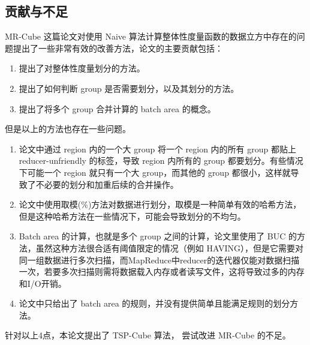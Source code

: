 \subsection{贡献与不足}

MR-Cube \cite{nandi2011distributed} 这篇论文对使用 Naive 算法计算整体性度量函数的数据立方中存在的问题提出了一些非常有效的改善方法，论文的主要贡献包括：

\begin{enumerate}
\item 提出了对整体性度量划分的方法。
\item 提出了如何判断 group 是否需要划分，以及其划分的方法。
\item 提出了将多个 group 合并计算的 batch area 的概念。
\end{enumerate}

但是以上的方法也存在一些问题。

\begin{enumerate}
\item 论文中通过 region 内的一个大 group 将一个 region 内的所有 group 都贴上 reducer-unfriendly 的标签，导致 region 内所有的 group 都要划分。有些情况下可能一个 region 就只有一个大 group，而其他的 group 都很小，这样就导致了不必要的划分和加重后续的合并操作。
\item 论文中使用取模(\%)方法对数据进行划分，取模是一种简单有效的哈希方法，但是这种哈希方法在一些情况下，可能会导致划分的不均匀。
\item Batch area 的计算，也就是多个 group 之间的计算，论文里使用了 BUC 的方法，虽然这种方法很合适有阈值限定的情况（例如 HAVING），但是它需要对同一组数据进行多次扫描，而MapReduce中reducer的迭代器仅能对数据扫描一次，若要多次扫描则需将数据载入内存或者读写文件，这将导致过多的内存和I/O开销。
\item 论文中只给出了 batch area 的规则，并没有提供简单且能满足规则的划分方法。
\end{enumerate}

针对以上4点，本论文提出了 TSP-Cube 算法， 尝试改进 MR-Cube 的不足。


